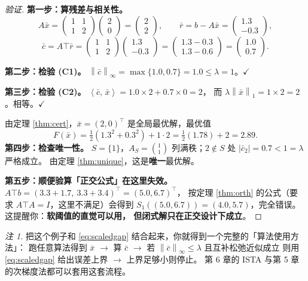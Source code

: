 \documentclass[11pt,a4paper,UTF8]{ctexart}
\theoremstyle{plain}
\theoremstyle{definition}
\theoremstyle{remark}
\newtheorem{remark}[theorem]{注}
\newcommand{\norm}[1]{\left\lVert #1 \right\rVert}
\newcommand{\abs}[1]{\left\lvert #1 \right\rvert}
\newcommand{\inner}[2]{\left\langle #1,\, #2 \right\rangle}
\newcommand{\tp}{^{\top}}
\begin{document}
\begin{proof}[验证]
\textbf{第一步：算残差与相关性。}
\[
A\bar x=\begin{pmatrix}1&1\\1&2\end{pmatrix}\begin{pmatrix}2\\0\end{pmatrix}=\begin{pmatrix}2\\2\end{pmatrix},
\qquad
\bar r=b-A\bar x=\begin{pmatrix}1.3\\-0.3\end{pmatrix},
\]
\[
\bar c=A\top\bar r=\begin{pmatrix}1&1\\1&2\end{pmatrix}\begin{pmatrix}1.3\\-0.3\end{pmatrix}
=\begin{pmatrix}1.3-0.3\\1.3-0.6\end{pmatrix}=\begin{pmatrix}1.0\\0.7\end{pmatrix}.
\]

\textbf{第二步：检验 (C1)。} $\norm{\bar c}_\infty=\max\{1.0,0.7\}=1.0\le\lambda=1$。$\checkmark$

\textbf{第三步：检验 (C2)。} $\inner{\bar c}{\bar x}=1.0\times2+0.7\times0=2$，
而 $\lambda\norm{\bar x}_1=1\times2=2$。相等。$\checkmark$

由定理 \ref{thm:cert}，$\bar x=(2,0)\tp$ 是全局最优解，最优值
\[
F(\bar x)=\tfrac12(1.3^2+0.3^2)+1\cdot2=\tfrac12(1.78)+2=2.89 .
\]
\textbf{第四步：检查唯一性。}
$S=\{1\}$，$A_S=\binom{1}{1}$ 列满秩；$2\notin S$ 处 $\abs{\bar c_2}=0.7<1=\lambda$ 严格成立。
由定理 \ref{thm:unique}，这是\textbf{唯一}最优解。

\textbf{第五步：顺便验算「正交公式」在这里失效。}
$A\top b=(3.3+1.7,\ 3.3+3.4)\tp=(5.0,6.7)\tp$，
按定理 \ref{thm:orth} 的公式（要求 $A\top A=I$，这里不满足）会得到
$S_1((5.0,6.7))=(4.0,5.7)$，完全错误。这提醒你：\textbf{软阈值的直觉可以用，
但闭式解只在正交设计下成立}。
\end{proof}

\begin{remark}
把这个例子和 \eqref{eq:scaledgap} 结合起来，你就得到一个完整的「算法使用方法」：
跑任意算法得到 $\bar x$ $\to$ 算 $\bar c$ $\to$ 若 $\norm{\bar c}_\infty\le\lambda$ 且互补松弛近似成立
则用 \eqref{eq:scaledgap} 给出误差上界 $\to$ 上界足够小则停止。
第 6 章的 ISTA 与第 5 章的次梯度法都可以套用这套流程。
\end{remark}
\end{document}
